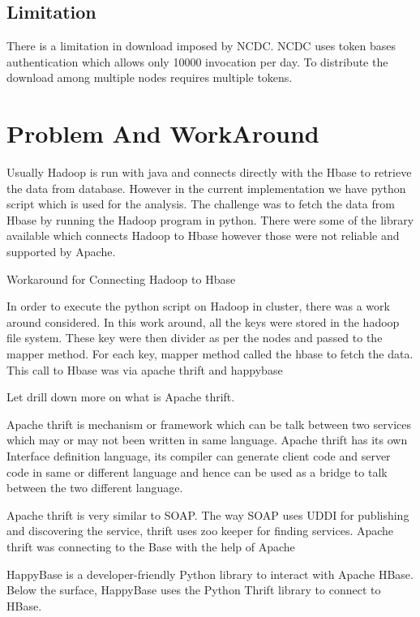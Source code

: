 \documentclass[9pt,twocolumn,twoside]{../../styles/osajnl}
\begin{document}
\subsection{Limitation}
There is a limitation in download imposed by NCDC. NCDC uses token bases authentication which allows only 10000 invocation per day. To distribute the download among multiple nodes requires multiple tokens.

\section{Problem And WorkAround}

Usually Hadoop is run with java and connects directly with the Hbase to retrieve the data from database.
However in the current implementation we have python script which is used for the analysis. The challenge was to fetch the data from Hbase by running the Hadoop program in python. 
There were some of the library available which connects Hadoop to Hbase  however those were not reliable and supported by Apache. 

Workaround for Connecting Hadoop to Hbase

In order to execute the python script on Hadoop in cluster, there was a work around considered. 
In this work around, all the keys were stored in the hadoop file system. These key were then divider as per the nodes and passed to the mapper method. 
For each key, mapper method called the hbase to fetch the data.  This call to Hbase was via apache thrift and happybase

Let drill down more on what is Apache thrift. 

Apache thrift is mechanism or framework which can be talk between two services which may or may not been written in same language. Apache thrift has its own 
Interface definition language, its compiler can generate client code and server code in same or different language and hence can be used as a bridge to talk between the two different language.

Apache thrift is very similar to SOAP. The way SOAP uses UDDI for publishing and discovering the service, thrift uses zoo keeper for finding services.
Apache thrift was connecting to the Base with the help of Apache 


HappyBase is a developer-friendly Python library to interact with Apache HBase. 
Below the surface, HappyBase uses the Python Thrift library to connect to HBase.	
\end{document}
